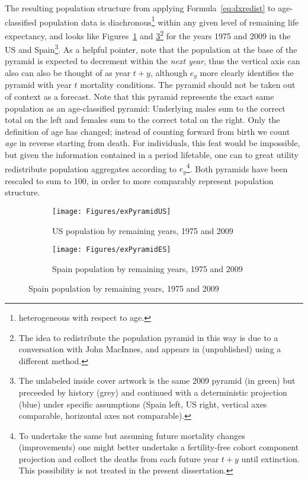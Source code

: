  \FloatBarrier
\label{sec:expopstruct1}
The resulting
population structure from applying Formula~\eqref{eq:dxredist} to age-classified
population data is diachronous\footnote{heterogeneous with respect to age.} 
within any given level of remaining life expectancy, and 
looks like Figures~\ref{fig:exPyrUS} and \ref{fig:exPyrES}\footnote{The idea to
redistribute the population pyramid in this way is due to a conversation with 
John MacInnes, and appears in \citep{MacInnes2013pop} (unpublished) using a
different method.} for the years 1975 and 2009 in the US and
Spain\footnote{The unlabeled inside cover artwork is the same 2009 pyramid (in
green) but preceeded by history (grey) and continued with a deterministic
projection (blue) under specific assumptions (Spain left, US right, vertical
axes comparable, horizontal axes not comparable).}. As a helpful pointer, note that the
population at the base of the pyramid is expected to decrement within the \textit{next year}, thus the vertical axis can also can also be thought of as year $t+y$, although $e_y$ more clearly identifies the pyramid with year $t$ mortality conditions. The pyramid should not be taken out of context as a forecast. Note that this pyramid represents the exact same
population as an age-classified pyramid: Underlying males sum to the correct total on 
the left and females sum to the correct total on the right. Only the definition of age has
changed; instead of counting forward from birth we count \textit{age} in reverse
starting from death. For individuals, this feat would be impossible, but given
 the information contained in a period lifetable, one can to great utility 
 redistribute population aggregates according to $e_y$\footnote{To undertake
 the same but assuming future mortality changes (improvements) one might
 better undertake a fertility-free cohort component projection and collect the
 deaths from each future year $t+y$ until extinction. This possibility is not
 treated in the present dissertation.}. Both pyramids have been rescaled
 to sum to 100, in order to more comparably represent population structure.

\begin{figure}
        \centering
        \begin{subfigure}
                \centering
                \caption{US population by remaining years, 1975 and 2009}
                \texttt{[image: Figures/exPyramidUS]}
                \label{fig:exPyrUS}
        \end{subfigure}
        \begin{subfigure}
                \centering
                \caption{Spain population by remaining years, 1975 and 2009}
                \texttt{[image: Figures/exPyramidES]} 
                \label{fig:exPyrES}
        \end{subfigure}
\end{figure}

